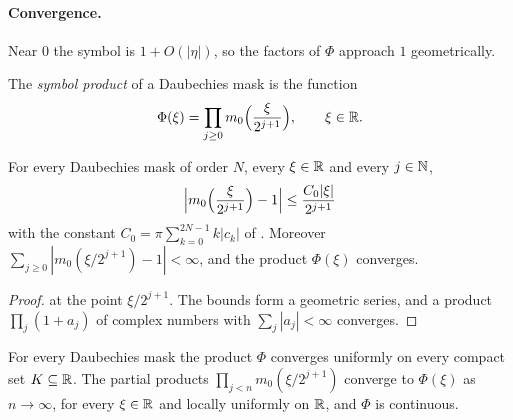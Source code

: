 \paragraph{Convergence.}
Near $0$ the symbol is $1 + O(|\eta|)$, so the factors of $\Phi$ approach $1$ geometrically.

\begin{definition}
\label{def:daub-symbol-product}
\leanok
{}
The \emph{symbol product} of a Daubechies mask is the function
\[
  \Phi(\xi) = \prod_{j \geq 0} m_0\Bigl(\frac{\xi}{2^{j+1}}\Bigr) , \qquad \xi \in \mathbb{R} .
\]
\end{definition}

\begin{lemma}
\label{lem:daub-symbol-product-factors}
\leanok
{}
For every Daubechies mask of order $N$, every $\xi \in \mathbb{R}$ and every $j \in \mathbb{N}$,
\[
  \Bigl|m_0\Bigl(\frac{\xi}{2^{j+1}}\Bigr) - 1\Bigr| \leq \frac{C_0 |\xi|}{2^{j+1}}
\]
with the constant $C_0 = \pi \sum_{k=0}^{2N-1} k |c_k|$ of .
Moreover $\sum_{j \geq 0} |m_0(\xi/2^{j+1}) - 1| < \infty$, and the product $\Phi(\xi)$ converges.
\end{lemma}

\begin{proof}
\leanok
{}
 at the point $\xi/2^{j+1}$. The bounds form a geometric
series, and a product $\prod_j (1 + a_j)$ of complex numbers with $\sum_j |a_j| < \infty$
converges.
\end{proof}

\begin{theorem}
\label{thm:daub-symbol-product-continuous}
\leanok
{}
For every Daubechies mask the product $\Phi$ converges uniformly on every compact set
$K \subseteq \mathbb{R}$. The partial products $\prod_{j<n} m_0(\xi/2^{j+1})$ converge to $\Phi(\xi)$ as
$n \to \infty$, for every $\xi \in \mathbb{R}$ and locally uniformly on $\mathbb{R}$, and $\Phi$ is continuous.
\end{theorem}

